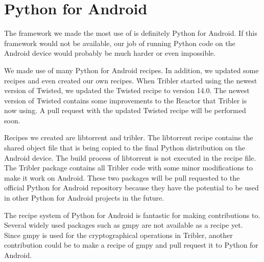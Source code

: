 \section{Python for Android}
	The framework we made the most use of is definitely Python for Android. If this framework would not be available, our job of running Python code on the Android device would probably be much harder or even impossible.
	
	We made use of many Python for Android recipes. In addition, we updated some recipes and even created our own recipes. When Tribler started using the newest version of Twisted, we updated the Twisted recipe to version 14.0. The newest version of Twisted contains some improvements to the Reactor that Tribler is now using. A pull request with the updated Twisted recipe will be performed soon.
	
	Recipes we created are libtorrent and tribler. The libtorrent recipe contains the shared object file that is being copied to the final Python distribution on the Android device. The build process of libtorrent is not executed in the recipe file. The Tribler package contains all Tribler code with some minor modifications to make it work on Android. These two packages will be pull requested to the official Python for Android repository because they have the potential to be used in other Python for Android projects in the future.
	
	The recipe system of Python for Android is fantastic for making contributions to. Several widely used packages such as gmpy are not available as a recipe yet. Since gmpy is used for the cryptographical operations in Tribler, another contribution could be to make a recipe of gmpy and pull request it to Python for Android.